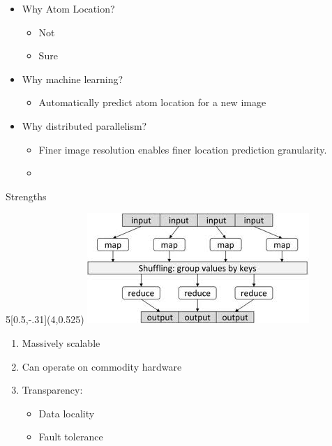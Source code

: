 \documentclass{beamer}
\begin{document}
\begin{frame}
\begin{minipage}{7.8cm}
\begin{itemize}
\item Why Atom Location?
	\begin{itemize}
	\item Not
	\item Sure
	\end{itemize}
\item Why machine learning? 
	\begin{itemize}
	\item Automatically predict atom location for a new image
	\end{itemize}
\item Why distributed parallelism? 
	\begin{itemize}
	\item Finer image resolution enables finer location prediction granularity.
	\item 
	\end{itemize}
\end{itemize}
\end{minipage}

\end{frame}


\begin{frame}{Strengths}

\begin{textblock}{5}[0.5,-.31](4,0.525)
\includegraphics[scale=.6]{mapreduce.jpeg}
\end{textblock}

\begin{minipage}{4cm}
\begin{enumerate}[1)]
\item Massively scalable
\item Can operate on commodity hardware
\item Transparency:
	\begin{itemize}
	\item Data locality
	\item Fault tolerance
	\end{itemize}
\end{enumerate}
\end{minipage}

\end{frame}
\end{document}
